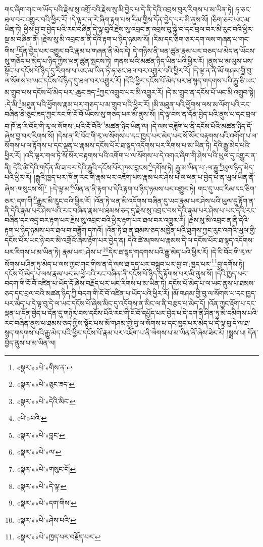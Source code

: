 གང་ཞིག་གང་ལ་ཡོད་པའི་རྗེས་སུ་འགྲོ་བའི་རྗེས་སུ་མི་བྱེད་པ་དེ་ནི་དེའི་འབྲས་བུར་རིགས་པ་མ་ཡིན་ཏེ། ཧ་ཅང་ཐལ་བར་འགྱུར་བའི་ཕྱིར་རོ། །དེ་ལྟར་ན་རེ་ཞིག་རྟག་པས་རིམ་གྱིས་དོན་བྱེད་པར་མི་ནུས་སོ། །ཅིག་ཅར་ཡང་མ་ཡིན་ཏེ། ཕྱིས་བྱ་བ་བྱེད་པའི་རང་བཞིན་དེ་ལྟ་བུའི་རྗེས་སུ་འབྲང་ན་འབྲས་བུ་སྐྱེ་བ་དང་བྲལ་བར་མི་རུང་བའི་ཕྱིར་སྔ་མ་བཞིན་ནོ། །རྗེས་སུ་མི་འབྲང་ན་ནི་དེའི་རྟག་པ་ཉིད་ཉམས་སོ། །རིམ་དང་ཅིག་ཅར་དག་ལས་གཞན་པ་གང་གིས་\footnote{«སྣར་»«པེ་»གིས་ན་}དོན་བྱེད་པར་འགྱུར་བའི་རྣམ་པ་གཞན་ནི་མེད་དེ། དེ་གཉིས་ནི་ཕན་ཚུན་རྣམ་པར་བཅད་པ་མེད་ན་ཡོངས་སུ་གཅོད་པ་མེད་པ་ཉིད་ཀྱིས་ཕན་ཚུན་སྤངས་ཏེ། གནས་པའི་མཚན་ཉིད་ཡིན་པའི་ཕྱིར་རོ། །ནུས་པ་མ་ལུས་པས་སྟོང་པ་དངོས་པོ་ཉིད་དུ་རིགས་པ་ཡང་མ་ཡིན་ཏེ་ཧ་ཅང་ཐལ་བར་འགྱུར་བའི་ཕྱིར་རོ། །དེ་ལྟ་ན་ནི་མོ་གཤམ་གྱི་བུ་ལ་སོགས་པ་ཡང་དངོས་པོ་ཉིད་དུ་ཐལ་བར་འགྱུར་རོ། །དེའི་ཕྱིར་དངོས་པོ་མེད་པར་ཐ་སྙད་གདགས་པའི་རྒྱུ་ཅི་ཡང་མ་གྲུབ་པས་དངོས་པོ་མེད་པར་:ཆུང་ཟད་\footnote{«སྣར་»«པེ་»ཅུང་ཟད་}ཀྱང་འགྲུབ་པར་མི་འགྱུར་རོ། །དེ་མ་གྲུབ་ན་དངོས་པོ་ཡང་མི་འགྲུབ་སྟེ། :དེ་མི་\footnote{«སྣར་»«པེ་»དེའི་མིང་}མཐུན་པའི་ཕྱོགས་རྣམ་པར་གཅད་པ་མ་གྲུབ་པའི་ཕྱིར་རོ། །མི་མཐུན་པའི་ཕྱོགས་ལས་མ་ལོག་པའི་རང་བཞིན་ནི་ཅུང་ཟད་ཀྱང་རང་གི་ངོ་བོ་ཡོངས་སུ་གཅད་པར་མི་ནུས་སོ། །དེ་ལྟ་བས་ན་དོན་བྱེད་པའི་ནུས་པ་དང་བྲལ་བ་ཁོ་ན་རི་བོང་གི་རྭ་ལ་སོགས་:པའི་ངོ་བོའི་\footnote{«པེ་»པའི་}མཚན་ཉིད་ཡིན་ལ། །དེ་ལས་བཟློག་པ་ནི་དངོས་པོའི་མཚན་ཉིད་དོ་ཞེས་བྱ་བར་རིགས་སོ། །དེས་ན་རི་བོང་གི་རྭ་ལ་སོགས་པ་དང་ཁྱད་པར་མེད་པར་སོ་སོར་བརྟགས་པའི་འགོག་པ་ལ་སོགས་པ་ལ་རྟོགས་པ་དང་ལྡན་པ་རྣམས་དངོས་པོར་ཐ་སྙད་འདོགས་པར་རིགས་པ་མ་ཡིན་ཏེ། དེའི་རྒྱུ་མེད་པའི་ཕྱིར་རོ། །འདི་ལྟར་གལ་ཏེ་སོ་སོར་བརྟགས་པའི་འགོག་པ་ལ་སོགས་པ་དེ་འགའ་ཞིག་གི་ཤེས་པའི་ཡུལ་དུ་འགྱུར་ན་ནི། དེའི་ཚེ་དེའི་གདོན་མི་ཟ་བར་དེའི་རྒྱུའི་དངོས་པོར་ཁས་བླངས་\footnote{«སྣར་»«པེ་»བླང་}དགོས་ཏེ། རྒྱུ་མ་ཡིན་པ་:ལ་རྒྱུ་\footnote{«སྣར་»«པེ་»ལ་}ཡུལ་ཉིད་མེད་པའི་ཕྱིར་རོ། །རྒྱུའི་ཁྱད་པར་ཁོ་ན་རང་གི་རྣམ་པར་འཇོག་པས་རྣམ་པར་ཤེས་པ་ལ་ཕན་པ་བྱེད་པ་ན་ཡུལ་ཡིན་ནོ་ཞེས་:གསུངས་སོ།\footnote{«སྣར་»«པེ་»གསུང་ངོ།} །:དེ་ལྟ་མ་\footnote{«སྣར་»«པེ་»དེ་ལྟ་}ཡིན་ན་ནི་རྟག་པ་དེའི་རྟག་པ་ཉིད་ཉམས་པར་འགྱུར་ཏེ། གང་དུ་ཡང་རིམ་དང་ཅིག་ཅར་:དག་གི་\footnote{«སྣར་»«པེ་»དག་གིས་}རྒྱུར་མི་རུང་བའི་ཕྱིར་རོ། །འོན་ཏེ་ཕན་མི་འདོགས་བཞིན་དུ་ཡང་རྣམ་པར་ཤེས་པའི་ཡུལ་དུ་རྟོག་ན་ནི་དེའི་རྣམ་པར་ཤེས་པའི་རང་བཞིན་རྣམ་པ་ཐམས་ཅད་དུ་རྗེས་སུ་འབྲང་བས་དེའི་རྣམ་པར་ཤེས་པ་ཡང་དེའི་རང་བཞིན་དང་འདྲ་བར་རྟག་པར་རྗེས་སུ་འབྲང་བའི་ཕྱིར་རྟག་པར་ཐལ་བར་འགྱུར་རོ། །རྗེས་སུ་མི་འབྲང་ན་ནི་དེའི་རྟག་པ་ཉིད་ཉམས་པར་ཐལ་བ་བཟློག་དཀའོ། །འོན་ཏེ་ཐ་ན་ཐམས་ཅད་མཁྱེན་པའི་ཐུགས་ཀྱང་རུང་འགའི་ཡུལ་གྱི་དངོས་པོར་ཡང་ཉེ་བར་མི་འགྲོའོ་ཞེས་རྟོག་པར་བྱེད་ན། དེའི་ཚེ་མཁས་པ་རྣམས་དེ་ལ་དངོས་པོར་ཐ་སྙད་འདོགས་པར་རིགས་པ་མ་ཡིན་ཏེ། རྣམ་པར་:ཤེས་པ་\footnote{«སྣར་»«པེ་»ཤེས་པའི་}དེར་ཐ་སྙད་གདགས་པའི་རྒྱུ་མེད་པའི་ཕྱིར་རོ། །དེ་རི་བོང་གི་རྭ་ལ་སོགས་པ་ཤིན་ཏུ་མེད་པ་ལས་ཀྱང་གང་གིས་ན་དེ་ལས་ཐ་དད་པར་བསྒྲུབ་པར་བྱ་བ་:ཁྱད་པར་\footnote{«སྣར་»«པེ་»ཁྱད་པར་བརྗོད་པར་}བྱ་དགོས་ཏེ། དངོས་པོ་མེད་པ་ལས་རྣམ་པར་མ་ཕྱེ་བའི་རང་བཞིན་ནི་དངོས་པོ་ཉིད་དུ་རྟོགས་པར་མི་ནུས་སོ། །དེའི་ཁྱད་པར་བདག་གི་ངོ་བོ་འཛིན་པ་ཡོད་དོ་ཞེས་བརྗོད་པར་ཡང་རིགས་པ་མ་ཡིན་ཏེ། དངོས་པོ་མེད་པ་ལ་ཡང་ནུས་པ་ཐམས་ཅད་དང་བྲལ་བའི་མཚན་ཉིད་ཀྱི་བདག་གི་ངོ་བོ་འཛིན་པ་ཡོད་པའི་ཕྱིར་རོ། །མོ་གཤམ་གྱི་བུ་ལ་སོགས་པ་དང་ཁྱད་པར་མེད་པ་དེ་ལྟ་བུ་དེ་ལ་ཡང་དངོས་པོ་ཞེས་མིང་དུ་འདོགས་ན་མིང་ལ་ནི་བརྩད་པ་མེད་དོ། །འོན་ཀྱང་རྟོག་པ་དང་ལྡན་པ་དོན་བྱེད་པ་དོན་དུ་གཉེར་བས་དངོས་པོའི་རང་གི་ངོ་བོ་དཔྱོད་པར་བྱེད་པ་དེ་དག་ནི་ཤིན་ཏུ་མི་དམིགས་པའི་རང་བཞིན་ནུས་པ་ཐམས་ཅད་ཀྱིས་སྟོང་པས་མོ་གཤམ་གྱི་བུ་ལ་སོགས་པ་དང་ཁྱད་པར་མེད་པ་དེ་ལྟ་བུ་དེ་ལ་ཐ་སྙད་གདགས་པའི་རྒྱུ་མེད་པའི་ཕྱིར་དངོས་པོ་རྣམ་པར་འཇོག་པ་ནི་ལེགས་པ་མ་ཡིན་ནོ་ཞེས་ཟེར་རོ། །སྨྲས་པ། དོན་བྱེད་ནུས་པ་མ་ཡིན་ལ། 